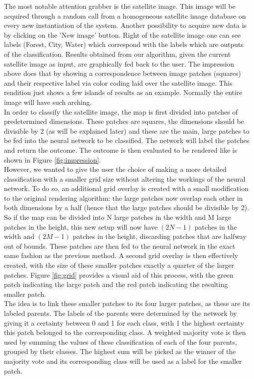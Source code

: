 \documentclass[a4paper,onecolumn]{report}
\begin{document}
The most notable attention grabber is the satellite image. This image will be acquired through a random call from a homogeneous satellite image database on every new instantiation of the system. Another possibility to acquire new data is by clicking on the 'New image' button. Right of the satellite image one can see labels (Forest, City, Water) which correspond with the labels which are outputs of the classification. Results obtained from our algorithm, given the current satellite image as input, are graphically fed back to the user. The impression above does that by showing a correspondence between image patches (squares) and their respective label via color coding laid over the satellite image. This rendition just shows a few islands of results as an example. Normally the entire image will have such arching.\\

In order to classify the satellite image, the map is first divided into patches of predetermined dimensions. These patches are squares, the dimensions should be divisible by $2$ (as will be explained later) and these are the main, large patches to be fed into the neural network to be classified. The network will label the patches and return the outcome. The outcome is then evaluated to be rendered like is shown in Figure \ref{fig:impression}.\\

However, we wanted to give the user the choice of making a more detailed classification with a smaller grid size without altering the workings of the neural network. To do so, an additional grid overlay is created with a small modification to the original rendering algorithm: the large patches now overlap each other in both dimensions by a half (hence that the large patches should be divisible by $2$). So if the map can be divided into N large patches in the width and M large patches in the height, this new setup will now have $(2N - 1)$ patches in the width and $(2M - 1)$ patches in the height, discarding patches that are halfway out of bounds. These patches are then fed to the neural network in the exact same fashion as the previous method. A second grid overlay is then effectively created, with the size of these smaller patches exactly a quarter of the larger patches. 
Figure \ref{fig:grid} provides a visual aid of this process, with the green patch indicating the large patch and the red patch indicating the resulting smaller patch.\\

The idea is to link these smaller patches to its four larger patches, as these are its labeled parents. The labels of the parents were determined by the network by giving it a certainty between 0 and 1 for each class, with 1 the highest certainty this patch belonged to the corresponding class.
A weighted majority vote is then used by summing the values of these classification of each of the four parents, grouped by their classes. The highest sum will be picked as the winner of the majority vote and its corresponding class will be used as a label for the smaller patch.\\
\end{document}
